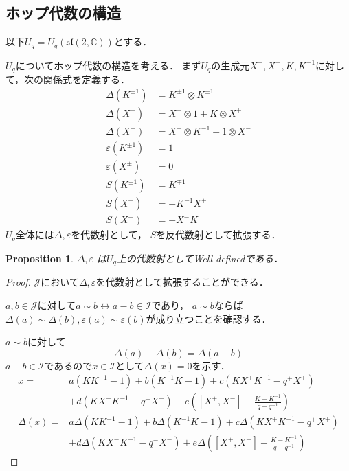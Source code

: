 \documentclass[10pt,dvipdfm]{beamer}
\newtheorem{proposition}{Proposition}
\newcommand{\CC}{\mathbb{C}}
\begin{document}
  \subsection{ホップ代数の構造}
  \begin{frame}
    以下$U_q = U_q(\mathfrak{sl}(2,\CC))$とする．

    $U_q$についてホップ代数の構造を考える．
    まず$U_q$の生成元$X^+,X^-,K,K^{-1}$に対して，次の関係式を定義する．
    \begin{align*}
      \Delta(K^{\pm1}) &= K^{\pm1}\otimes K^{\pm1}\\
      \Delta(X^+) &= X^+\otimes 1 + K\otimes X^+\\
      \Delta(X^-) &= X^-\otimes K^{-1} + 1\otimes X^-\\
      \varepsilon(K^{\pm1}) &= 1\\
      \varepsilon(X^{\pm}) &= 0\\
      S(K^{\pm1}) &= K^{\mp1}\\
      S(X^+) &= -K^{-1}X^+\\
      S(X^-) &= -X^-K
    \end{align*}
    $U_q$全体には$\Delta,\varepsilon$を代数射として，
    $S$を反代数射として拡張する．
  \end{frame}
  \begin{frame}
    \begin{proposition}
      $\Delta,\varepsilon$ は$U_q$上の代数射としてWell-definedである．
    \end{proposition}
    \begin{proof}
      $\mathscr{J}$において$\Delta,\varepsilon$を代数射として拡張することができる．

      $a,b\in\mathscr{J}$に対して$a\sim b\leftrightarrow a-b\in\mathscr{I}$であり，
      $a\sim b$ならば$\Delta(a)\sim\Delta(b),\varepsilon(a)\sim\varepsilon(b)$が成り立つことを確認する．
      
      $a\sim b$に対して
      \[
      \Delta(a)-\Delta(b) = \Delta(a-b)
      \]
      $a-b\in \mathscr{I}$であるので$x \in \mathscr{I}$として$\Delta(x)=0$を示す．
      \begin{align*}
        x =& a(KK^{-1}-1)+b(K^{-1}K-1)+c(KX^+K^{-1}-q^+X^+)\\
        &+d(KX^-K^{-1}-q^-X^-)+e\left([X^+,X^-]-\frac{K-K^{-1}}{q-q^{-1}}\right)\\
        \Delta(x) =& a\Delta(KK^{-1}-1)+b\Delta(K^{-1}K-1)+c\Delta(KX^+K^{-1}-q^+X^+)\\
        &+d\Delta(KX^-K^{-1}-q^-X^-)+e\Delta\left([X^+,X^-]-\frac{K-K^{-1}}{q-q^{-1}}\right)
      \end{align*}
      \let\qedsymbol\relax
    \end{proof}
  \end{frame}
\end{document}
